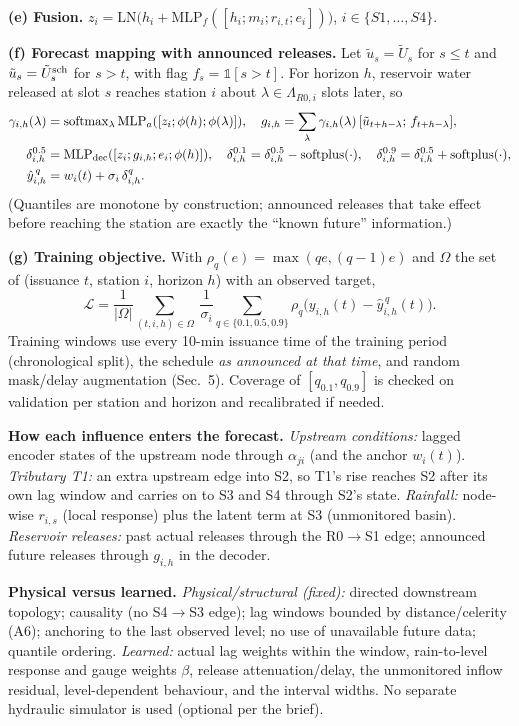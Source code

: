\noindent\textbf{(e) Fusion.} $z_i=\mathrm{LN}\big(h_i+\mathrm{MLP}_f([h_i;m_i;r_{i,t};e_i])\big)$, $i\in\{S1,\dots,S4\}$.

\noindent\textbf{(f) Forecast mapping with announced releases.} Let $\tilde u_s=\tilde U_s$ for $s\le t$ and $\tilde u_s=\tilde U^{\rm sch}_s$ for $s>t$, with flag $f_s=\mathbb 1[s>t]$.
For horizon $h$, reservoir water released at slot $s$ reaches station $i$ about $\lambda\in\Lambda_{R0,i}$ slots later, so
\begin{align}
\gamma_{i,h}(\lambda)&=\mathrm{softmax}_{\lambda}\,\mathrm{MLP}_a([z_i;\phi(h);\phi(\lambda)]),\quad
g_{i,h}=\sum_{\lambda}\gamma_{i,h}(\lambda)\,[\tilde u_{t+h-\lambda};\,f_{t+h-\lambda}],\\
\delta^{0.5}_{i,h}&=\mathrm{MLP}_{\rm dec}([z_i;g_{i,h};e_i;\phi(h)]),\quad
\delta^{0.1}_{i,h}=\delta^{0.5}_{i,h}-\mathrm{softplus}(\cdot),\quad \delta^{0.9}_{i,h}=\delta^{0.5}_{i,h}+\mathrm{softplus}(\cdot),\\
\hat y^{\,q}_{i,h}&=w_i(t)+\sigma_i\,\delta^{q}_{i,h}.
\end{align}
(Quantiles are monotone by construction; announced releases that take effect before reaching the station are exactly the ``known future'' information.)

\noindent\textbf{(g) Training objective.} With $\rho_q(e)=\max(qe,(q-1)e)$ and $\Omega$ the set of (issuance $t$, station $i$, horizon $h$) with an observed target,
\[
\mathcal L=\frac1{|\Omega|}\sum_{(t,i,h)\in\Omega}\ \frac1{\sigma_i}\sum_{q\in\{0.1,0.5,0.9\}}\rho_q\!\big(y_{i,h}(t)-\hat y^{\,q}_{i,h}(t)\big).
\]
Training windows use every 10-min issuance time of the training period (chronological split), the schedule \emph{as announced at that time},
and random mask/delay augmentation (Sec.~5). Coverage of $[q_{0.1},q_{0.9}]$ is checked on validation per station and horizon and recalibrated if needed.

\noindent\textbf{How each influence enters the forecast.}
\emph{Upstream conditions:} lagged encoder states of the upstream node through $\alpha_{ji}$ (and the anchor $w_i(t)$).
\emph{Tributary T1:} an extra upstream edge into S2, so T1's rise reaches S2 after its own lag window and carries on to S3 and S4 through S2's state.
\emph{Rainfall:} node-wise $r_{i,s}$ (local response) plus the latent term at S3 (unmonitored basin).
\emph{Reservoir releases:} past actual releases through the R0$\to$S1 edge; announced future releases through $g_{i,h}$ in the decoder.

\noindent\textbf{Physical versus learned.} \emph{Physical/structural (fixed):} directed downstream topology; causality (no S4$\to$S3 edge); lag windows bounded by distance/celerity (A6); anchoring to the last observed level;
no use of unavailable future data; quantile ordering. \emph{Learned:} actual lag weights within the window, rain-to-level response and gauge weights $\beta$,
release attenuation/delay, the unmonitored inflow residual, level-dependent behaviour, and the interval widths. No separate hydraulic simulator is used (optional per the brief).

